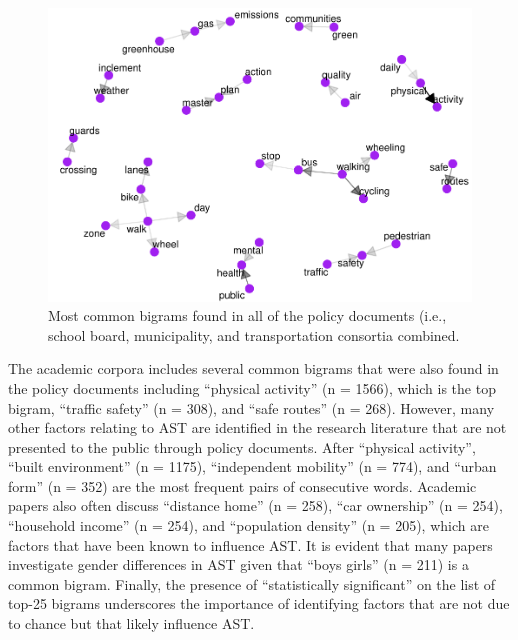 \documentclass[]{elsarticle} %
\begin{document}
\begin{figure}

{\centering \includegraphics[width=1\linewidth]{AST-Framing-Ontario_files/figure-latex/policy-visual-1} 

}

\caption{Most common bigrams found in all of the policy documents (i.e., school board, municipality, and transportation consortia combined.}\label{fig:policy-visual}
\end{figure}

The academic corpora includes several common bigrams that were also
found in the policy documents including ``physical activity'' (n =
1566), which is the top bigram, ``traffic safety'' (n = 308), and ``safe
routes'' (n = 268). However, many other factors relating to AST are
identified in the research literature that are not presented to the
public through policy documents. After ``physical activity'', ``built
environment'' (n = 1175), ``independent mobility'' (n = 774), and
``urban form'' (n = 352) are the most frequent pairs of consecutive
words. Academic papers also often discuss ``distance home'' (n = 258),
``car ownership'' (n = 254), ``household income'' (n = 254), and
``population density'' (n = 205), which are factors that have been known
to influence AST. It is evident that many papers investigate gender
differences in AST given that ``boys girls'' (n = 211) is a common
bigram. Finally, the presence of ``statistically significant'' on the
list of top-25 bigrams underscores the importance of identifying factors
that are not due to chance but that likely influence AST.
\end{document}
